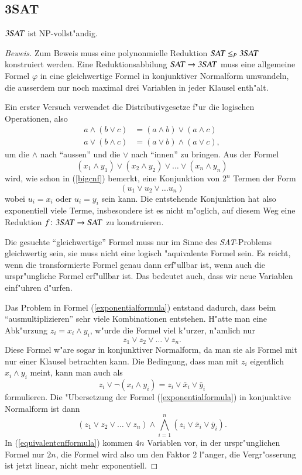 \subsection{3SAT}
\begin{satz}
$\text{\textsl{3SAT}}$ ist NP-vollst"andig.
\end{satz}

\begin{proof}[Beweis]
Zum Beweis muss eine polynonmielle Reduktion
$\text{\textsl{SAT}}\le_P\text{\textsl{3SAT}}$ konstruiert werden.
Eine Reduktionsabbilung
$\text{\textsl{SAT}}\to\text{\textsl{3SAT}}$ muss eine allgemeine Formel
$\varphi$ in eine gleichwertige Formel in konjunktiver Normalform umwandeln, 
die ausserdem nur noch maximal drei Variablen in jeder Klausel enth"alt.

Ein erster Versuch verwendet die Distributivgesetze f"ur die 
logischen Operationen, also
\begin{align*}
a\wedge(b\vee c)&=(a\wedge b)\vee(a\wedge c)\\
a\vee(b\wedge c)&=(a\vee b)\wedge(a\vee c),
\end{align*}
um die $\wedge$ nach ``aussen'' und die $\vee$ nach ``innen'' zu
bringen. Aus der Formel 
\begin{equation}
(x_1\wedge y_1)
\vee
(x_2\wedge y_2)
\vee
\dots
\vee
(x_n\wedge y_n)
\label{exponentialformula}
\end{equation}
wird, wie schon in (\ref{bigcnf}) bemerkt, eine Konjunktion von $2^n$
Termen der Form
\[
(u_1\vee u_2\vee \dots u_n)
\]
wobei $u_i=x_i$ oder $u_i=y_i$ sein kann. 
Die entstehende Konjunktion hat also exponentiell viele Terme, insbesondere
ist es nicht m"oglich, auf diesem Weg eine Reduktion
$f\colon\text{\textsl{3SAT}}\to\text{\textsl{SAT}}$ zu konstruieren.

Die gesuchte ``gleichwertige'' Formel muss nur im Sinne des
\textsl{SAT}-Problems gleichwertig sein, sie muss nicht eine
logisch "aquivalente Formel sein. Es reicht, wenn die transformierte
Formel genau dann erf"ullbar ist, wenn auch die urspr"ungliche Formel
erf"ullbar ist. Das bedeutet auch, dass wir neue Variablen einf"uhren
d"urfen.

Das Problem in Formel (\ref{exponentialformula}) entstand dadurch, dass
beim ``ausmultiplizieren'' sehr viele Kombinationen entstehen. H"atte
man eine Abk"urzung $z_i=x_i\wedge y_i$, w"urde die Formel viel
k"urzer, n"amlich nur
\[
z_1\vee z_2\vee\dots\vee z_n.
\]
Diese Formel w"are sogar in konjunktiver Normalform, da man sie
als Formel mit nur einer Klausel betrachten kann.
Die Bedingung, dass man mit $z_i$ eigentlich $x_i\wedge y_i$ 
meint, kann man auch als 
\[
z_i\vee \neg(x_i\wedge y_i)
=
z_i\vee \bar x_i\vee\bar y_i
\]
formulieren. Die "Ubersetzung der Formel (\ref{exponentialformula})
in konjunktive Normalform ist dann
\begin{equation}
(z_1\vee z_2\vee\dots\vee z_n)
\wedge
\bigwedge_{i=1}^n (z_i\vee \bar x_i\vee\bar y_i).
\label{equivalentcnfformula}
\end{equation}
In (\ref{equivalentcnfformula}) kommen $4n$ Variablen vor,
in der urspr"unglichen Formel
nur $2n$, die Formel wird also um den Faktor $2$ l"anger, die
Vergr"osserung ist jetzt linear, nicht mehr exponentiell.


\end{proof}
